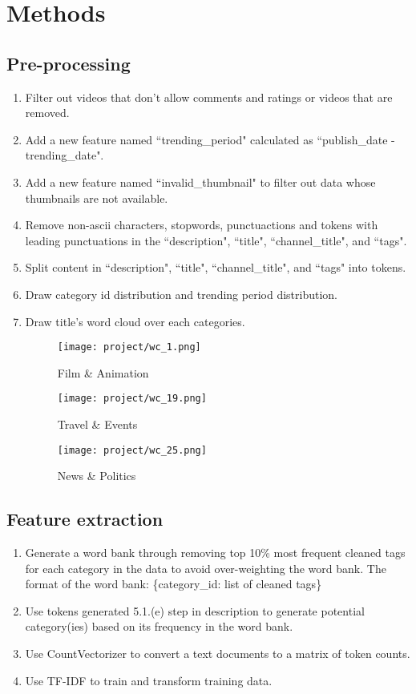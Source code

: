 \documentclass[english]{article}
\begin{document}
\section{Methods}
\begin{enumerate}
    \subsection{Pre-processing}
    \begin{enumerate}
    \item Filter out videos that don't allow comments and ratings or videos that are removed.
    \item Add a new feature named ``trending\_period" calculated as ``publish\_date - trending\_date".
    \item Add a new feature named ``invalid\_thumbnail" to filter out data whose thumbnails are not available.
    \item Remove non-ascii characters, stopwords, punctuactions and tokens with leading punctuations in the ``description", ``title", ``channel\_title", and ``tags".
    \item Split content in ``description", ``title", ``channel\_title", and ``tags" into tokens.
    \item Draw category id distribution and trending period distribution.
    \item Draw title's word cloud over each categories.\\
    \begin{figure}[!htb]
      \texttt{[image: project/wc\_1.png]}
      \caption{Film \& Animation}\label{fig:awesome_image1}
    \endminipage\hfill
      \texttt{[image: project/wc\_19.png]}
      \caption{Travel \& Events}\label{fig:awesome_image2}
    \endminipage\hfill
      \texttt{[image: project/wc\_25.png]}
      \caption{News \& Politics} \label{fig:awesome_image3}
    \endminipage
    \end{figure}

    \end{enumerate}
    
    \subsection{Feature extraction}
    \begin{enumerate}
    \item Generate a word bank through removing top 10\% most frequent cleaned tags for each category in the data to avoid over-weighting the word bank. The format of the word bank: 
    \{category\_id: list of cleaned tags\}
    \item Use tokens generated 5.1.(e) step in description to generate potential category(ies) based on its frequency in the word bank.
    \item Use CountVectorizer to convert a text documents to a matrix of token counts.
    \item Use TF-IDF to train and transform training data.
    \end{enumerate}


\end{enumerate}
\end{document}
